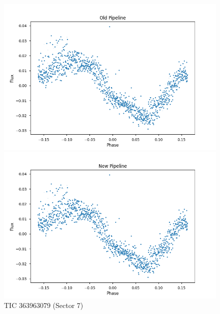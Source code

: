 \documentclass{article}
\begin{document}
\begin{figure}[h!]
    \centering
    \begin{minipage}{0.45\textwidth}
        \centering
        \includegraphics[width=\textwidth]{./figures/6_old.png}
    \end{minipage}%
    \hfill
    \begin{minipage}{0.45\textwidth}
        \centering
        \includegraphics[width=\textwidth]{./figures/6_new.png}
    \end{minipage}
    \caption{TIC 363963079 (Sector 7)}
\end{figure}
\end{document}
